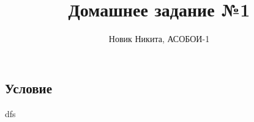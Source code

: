 \documentclass[a4paper]{article}
\author{Новик Никита, АСОБОИ-1}
\title{Домашнее задание №1}
\begin{document}
\maketitle

\section{}

\subsection{Условие}
dfs
\end{document}
